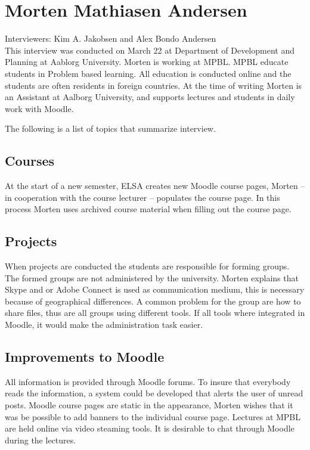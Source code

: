 \section{Morten Mathiasen Andersen}
\label{sec:morten}
Interviewers: Kim A. Jakobsen and Alex Bondo Andersen\\

This interview was conducted on March 22\ths{} at Department of Development and Planning at Aablorg University.
Morten is working at MPBL. 
MPBL educate students in Problem based learning.
All education is conducted online and the students are often residents in foreign countries. 
At the time of writing Morten is an Assistant at Aalborg University, and supports lectures and students in daily work with Moodle.

The following is a list of topics that summarize interview.

\subsection*{Courses}
At the start of a new semester, ELSA creates new Moodle course pages, Morten -- in cooperation with the course lecturer -- populates the course page. 
In this process Morten uses archived course material when filling out the course page.

\subsection*{Projects}
When projects are conducted the students are responsible for forming groups. 
The formed groups are not administered by the university.
Morten explains that Skype and or Adobe Connect is used as communication medium, this is necessary because of geographical differences. 
A common problem for the group are how to share files, thus are all groups using different tools. 
If all tools where integrated in Moodle, it would make the administration task easier.

\subsection*{Improvements to Moodle}
All information is provided through Moodle forums. 
To insure that everybody reads the information, a system could be developed that alerts the user of unread posts.
Moodle course pages are static in the appearance, Morten wishes that it was be possible to add banners to the individual course page.
Lectures at MPBL are held online via video steaming tools. 
It is desirable to chat through Moodle during the lectures.   

